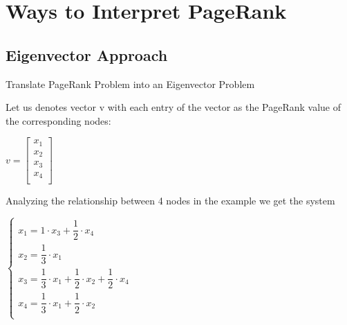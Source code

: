 \documentclass{beamer}
\begin{document}
\section{Ways to Interpret PageRank}

\subsection{Eigenvector Approach}
\begin{frame}[t]{Translate PageRank Problem into an Eigenvector Problem}
    \begin{outline}
        \1 Let us denotes vector v with each entry of the vector as the PageRank value of the corresponding nodes: 
        \begin{center}
            $v = \begin{bmatrix}
                x_1\\
                x_2\\
                x_3\\
                x_4\\
            \end{bmatrix}$
        \end{center}
        \1 Analyzing the relationship between 4 nodes in the example we get the system 
        \begin{center}
            $\begin{cases}
                x_1 = 1 \cdot x_3 + \dfrac{1}{2}\cdot x_4&\\[6pt]
                x_2 = \dfrac{1}{3}\cdot x_1&\\[6pt]
                x_3 = \dfrac{1}{3}\cdot x_1 + \dfrac{1}{2}\cdot x_2 + \dfrac{1}{2}\cdot x_4&\\[6pt]
                x_4 = \dfrac{1}{3}\cdot x_1 + \dfrac{1}{2}\cdot x_2&\\[6pt]
            \end{cases}$
        \end{center}
    \end{outline}
\end{frame}
\end{document}
